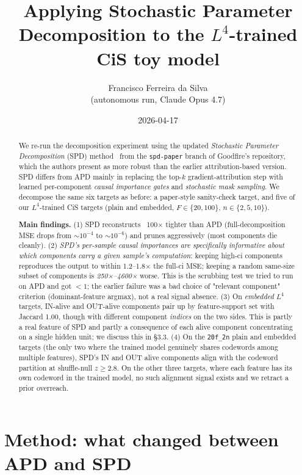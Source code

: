 \documentclass[11pt]{article}
\title{Applying Stochastic Parameter Decomposition to the $L^4$-trained CiS toy model}
\author{Francisco Ferreira da Silva\\ \small (autonomous run, Claude Opus 4.7)}
\date{2026-04-17}
\begin{document}
\maketitle

\begin{abstract}
\noindent
We re-run the decomposition experiment using the updated \emph{Stochastic
Parameter Decomposition} (SPD) method~\cite{bushnaqspdpaper} from the
\texttt{spd-paper} branch of Goodfire's repository, which the authors
present as more robust than the earlier attribution-based version. SPD
differs from APD mainly in replacing the top-$k$ gradient-attribution
step with learned per-component \emph{causal importance gates} and
\emph{stochastic mask sampling}. We decompose the same six targets as
before: a paper-style sanity-check target, and five of our
$L^4$-trained CiS targets (plain and embedded, $F \in \{20, 100\}$,
$n \in \{2, 5, 10\}$).

\textbf{Main findings.} (1) SPD reconstructs ~100× tighter than APD
(full-decomposition MSE drops from $\sim 10^{-4}$ to $\sim 10^{-6}$) and
prunes aggressively (most components die cleanly). (2) \emph{SPD's
per-sample causal importances are specifically informative about which
components carry a given sample's computation}: keeping high-ci
components reproduces the output to within 1.2--1.8× the full-ci MSE;
keeping a random same-size subset of components is \emph{250×--4600×}
worse. This is the scrubbing test we tried to run on APD and got
$< 1$; the earlier failure was a bad choice of "relevant component"
criterion (dominant-feature argmax), not a real signal absence. (3) On
\emph{embedded} $L^4$ targets, IN-alive and OUT-alive components pair
up by feature-support set with Jaccard 1.00, though with different
component \emph{indices} on the two sides. This is partly a real
feature of SPD and partly a consequence of each alive component
concentrating on a single hidden unit; we discuss this in §3.3. (4)
On the \texttt{20f\_2n} plain and embedded targets (the only two where
the trained model genuinely shares codewords among multiple features),
SPD's IN and OUT alive components align with the codeword partition at
shuffle-null $z \ge 2.8$. On the other three targets, where each
feature has its own codeword in the trained model, no such alignment
signal exists and we retract a prior overreach.
\end{abstract}

\section{Method: what changed between APD and SPD}
\end{document}
